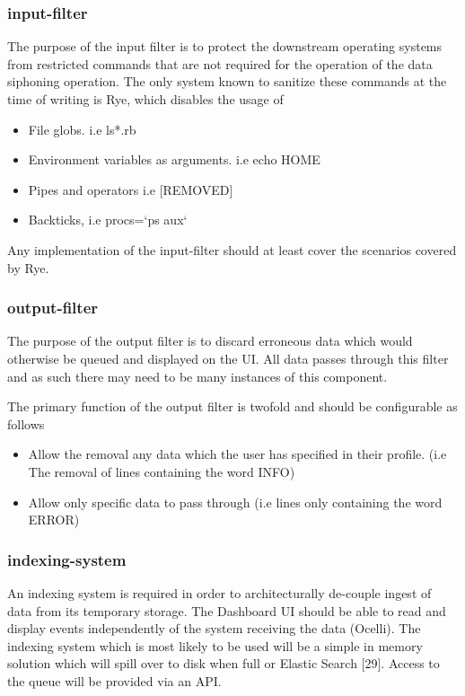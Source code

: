 \documentclass{llncs}
\begin{document}
\subsubsection{input-filter}
	
The purpose of the input filter is to protect the downstream operating systems from restricted commands that are not required for the operation of the data siphoning operation. The only system known to sanitize these commands at the time of writing is Rye, which disables the usage of

\begin{itemize}
\item	File globs. i.e ls*.rb
\item	Environment variables as arguments. i.e echo HOME
\item	Pipes and operators i.e  [REMOVED]
\item	Backticks, i.e procs=`ps aux`
\end{itemize}

Any implementation of the input-filter should at least cover the scenarios covered by Rye. 

\subsubsection{ output-filter}
	
The purpose of the output filter is to discard erroneous data which would otherwise be queued and displayed on the UI. All data passes through this filter and as such there may need to be many instances of this component.

The primary function of the output filter is twofold and should be configurable as follows

\begin{itemize}
\item	Allow the removal any data which the user has specified in their profile. (i.e The removal of lines containing the word INFO)
\item	Allow only specific data to pass through (i.e lines only containing the word ERROR)
\end{itemize}
\subsubsection{indexing-system}

An indexing system is required in order to architecturally de-couple ingest of data from its temporary storage. The Dashboard UI should be able to read and display events independently of the system receiving the data (Ocelli). The indexing system which is most likely to be used will be a simple in memory solution which will spill over to disk when full or Elastic Search [29]. Access to the queue will be provided via an API.
\end{document}
